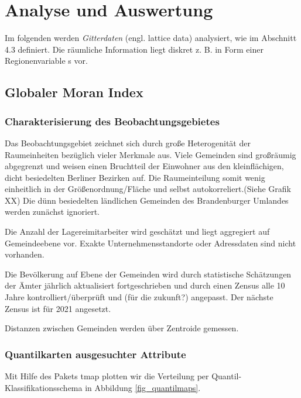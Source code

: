 \chapter{Analyse und Auswertung}

Im folgenden werden \emph{Gitterdaten} (engl. lattice data) analysiert, wie im Abschnitt 4.3 definiert. 
Die räumliche Information liegt diskret z. B. in Form einer Regionenvariable s vor. 

\section{Globaler Moran Index}

\subsection{Charakterisierung des Beobachtungsgebietes}

Das Beobachtungsgebiet zeichnet sich durch große Heterogenität der Raumeinheiten bezüglich vieler Merkmale aus. 
Viele Gemeinden sind großräumig abgegrenzt und weisen einen Bruchtteil der Einwohner aus den kleinflächigen, 
dicht besiedelten Berliner Bezirken auf. Die Raumeinteilung somit wenig einheitlich in der Größenordnung/Fläche 
und selbst autokorreliert.(Siehe Grafik XX)
Die dünn besiedelten ländlichen Gemeinden des Brandenburger Umlandes werden zunächst ignoriert.

Die Anzahl der Lagereimitarbeiter wird geschätzt und liegt aggregiert auf Gemeindeebene vor. 
Exakte Unternehmensstandorte oder Adressdaten sind nicht vorhanden.

Die Bevölkerung auf Ebene der Gemeinden wird durch statistische Schätzungen der Ämter jährlich aktualisiert 
fortgeschrieben und durch einen Zensus alle 10 Jahre kontrolliert/überprüft und (für die zukunft?) angepasst. 
Der nächste Zensus ist für 2021 angesetzt.

Distanzen zwischen Gemeinden werden über Zentroide gemessen.

\subsection{Quantilkarten ausgesuchter Attribute}
Mit Hilfe des Pakets tmap plotten wir die Verteilung per Quantil-Klassifikationsschema 
in Abbildung \ref{fig_quantilmaps}.




